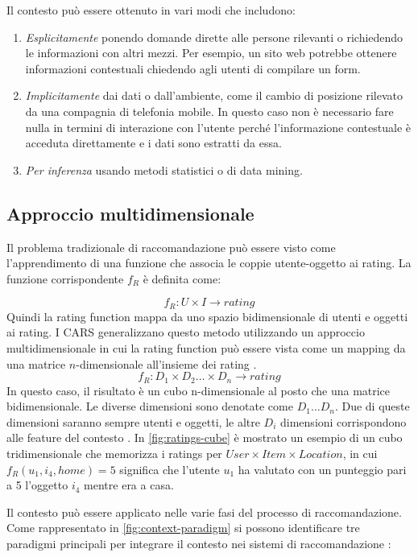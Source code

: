 \noindent Il contesto può essere ottenuto in vari modi \cite{recsys-handbook} che includono:
\begin{enumerate}
 \item \textit{Esplicitamente} ponendo domande dirette alle persone rilevanti o richiedendo le informazioni con altri mezzi. Per esempio, un sito web potrebbe ottenere informazioni contestuali chiedendo agli utenti di compilare un form.
 \item \textit{Implicitamente} dai dati o dall'ambiente, come il cambio di posizione rilevato da una compagnia di telefonia mobile. In questo caso non è necessario fare nulla in termini di interazione con l'utente perché l'informazione contestuale è acceduta direttamente e i dati sono estratti da essa.
 \item \textit{Per inferenza} usando metodi statistici o di data mining. 
\end{enumerate}

\subsection{Approccio multidimensionale}
Il problema tradizionale di raccomandazione può essere visto come l'apprendimento di una funzione che associa le coppie utente-oggetto ai rating. La funzione corrispondente $f_R$ è definita come:

$$
f_R : U \times I \rightarrow rating
$$
Quindi la rating function mappa da uno spazio bidimensionale di utenti e oggetti ai rating.
I CARS generalizzano questo metodo utilizzando un approccio multidimensionale in cui la rating function può essere vista come un mapping da una matrice $n$-dimensionale all'insieme dei rating \cite{survey-mattia}.
$$
f_R : D_1 \times D_2 \dots \times D_n \rightarrow rating
$$
In questo caso, il risultato è un cubo n-dimensionale al posto che una matrice bidimensionale. Le diverse dimensioni sono denotate come $D_1 \dots D_n$. Due di queste dimensioni saranno sempre utenti e oggetti, le altre $D_i$ dimensioni corrispondono alle feature del contesto \cite{recsys-book}. In \autoref{fig:ratings-cube} è mostrato un esempio di un cubo tridimensionale che memorizza i ratings per $User \times Item \times Location$, in cui $f_R(u_1, i_4, home) = 5$ significa che l'utente $u_1$ ha valutato con un punteggio pari a 5 l'oggetto $i_4$ mentre era a casa.

Il contesto può essere applicato nelle varie fasi del processo di raccomandazione. Come rappresentato in \autoref{fig:context-paradigm} si possono identificare tre paradigmi principali per integrare il contesto nei sistemi di raccomandazione \cite{recsys-handbook}:

